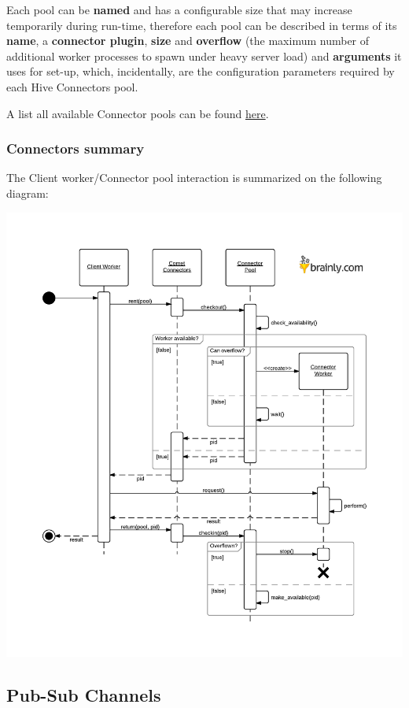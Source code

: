 \documentclass[a4paper]{article}
\begin{document}
Each pool can be \textbf{named} and has a configurable size that may increase temporarily during run-time, therefore each pool can be described in terms of its \textbf{name}, a \textbf{connector plugin}, \textbf{size} and \textbf{overflow} (the maximum number of additional worker processes to spawn under heavy server load) and \textbf{arguments} it uses for set-up, which, incidentally, are the configuration parameters required by each Hive Connectors pool.

\noindent
A list all available Connector pools can be found \hyperref[sec-8-4]{here}.
\subsubsection{Connectors summary}
\label{sec-7-2-1}

The Client worker/Connector pool interaction is summarized on the following diagram:

\begin{center}
\includegraphics[scale=0.9]{./img/connectors.pdf}
\end{center}
\subsection{Pub-Sub Channels}
\label{sec-7-3}
\label{ref-pubsub}
\end{document}
